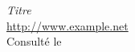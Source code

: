 \renewcommand{\bibname}{Webographie}
\begin{thebibliography}{9}
    \emph{Titre}\\
    \url{http://www.example.net}\\
    Consulté le 
\end{thebibliography}